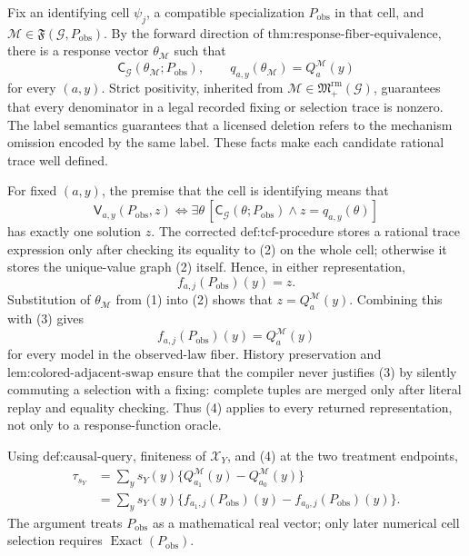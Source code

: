 Fix an identifying cell \(\psi_j\), a compatible specialization \(P_{\mathrm{obs}}\) in that cell, and \(\mathcal M\in\mathfrak F(\mathcal G,P_{\mathrm{obs}})\). By the forward direction of \(\text{thm:response-fiber-equivalence}\), there is a response vector \(\theta_{\mathcal M}\) such that
\[
\mathsf C_{\mathcal G}(\theta_{\mathcal M};P_{\mathrm{obs}}),
\qquad
q_{a,y}(\theta_{\mathcal M})=Q_a^{\mathcal M}(y)
\tag{1}
\]
for every \((a,y)\). Strict positivity, inherited from \(\mathcal M\in\mathfrak M_+^{\mathrm{rm}}(\mathcal G)\), guarantees that every denominator in a legal recorded fixing or selection trace is nonzero. The label semantics guarantees that a licensed deletion refers to the mechanism omission encoded by the same label. These facts make each candidate rational trace well defined.

For fixed \((a,y)\), the premise that the cell is identifying means that
\[
\mathsf V_{a,y}(P_{\mathrm{obs}},z)
\Longleftrightarrow
\exists\theta\,[\mathsf C_{\mathcal G}(\theta;P_{\mathrm{obs}})
\wedge z=q_{a,y}(\theta)]
\tag{2}
\]
has exactly one solution \(z\). The corrected \(\text{def:tcf-procedure}\) stores a rational trace expression only after checking its equality to (2) on the whole cell; otherwise it stores the unique-value graph (2) itself. Hence, in either representation,
\[
f_{a,j}(P_{\mathrm{obs}})(y)=z.
\tag{3}
\]
Substitution of \(\theta_{\mathcal M}\) from (1) into (2) shows that \(z=Q_a^{\mathcal M}(y)\). Combining this with (3) gives
\[
f_{a,j}(P_{\mathrm{obs}})(y)=Q_a^{\mathcal M}(y)
\tag{4}
\]
for every model in the observed-law fiber. History preservation and \(\text{lem:colored-adjacent-swap}\) ensure that the compiler never justifies (3) by silently commuting a selection with a fixing: complete tuples are merged only after literal replay and equality checking. Thus (4) applies to every returned representation, not only to a response-function oracle.

Using \(\text{def:causal-query}\), finiteness of \(\mathcal X_Y\), and (4) at the two treatment endpoints,
\[
\begin{aligned}
\tau_{s_Y}
&=\sum_y s_Y(y)\{Q_{a_1}^{\mathcal M}(y)-Q_{a_0}^{\mathcal M}(y)\}\\
&=\sum_y s_Y(y)\{f_{a_1,j}(P_{\mathrm{obs}})(y)-f_{a_0,j}(P_{\mathrm{obs}})(y)\}.
\end{aligned}
\tag{5}
\]
The argument treats \(P_{\mathrm{obs}}\) as a mathematical real vector; only later numerical cell selection requires \(\operatorname{Exact}(P_{\mathrm{obs}})\).